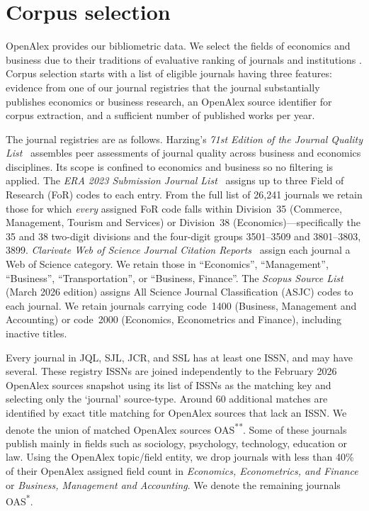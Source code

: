 \section{Corpus selection}
\label{sec:sources}
OpenAlex \citep{priemOpenAlexFullyopenIndex2022, alperinAnalysisSuitabilityOpenAlex2024, vaneckneesjanOpeningCWTSLeiden2024} provides our bibliometric data. We select the fields of economics and business due to their traditions of evaluative ranking of journals and institutions \citep[e.g.][]{liebowitzAssessingRelativeImpacts1984, boricPossibilitiesRankingBusiness2024}. Corpus selection starts with a list of eligible journals having three features: evidence from one of our journal registries that the journal substantially 
publishes economics or business research, an OpenAlex source identifier for corpus extraction, and a sufficient number of published works per year.

The journal registries are as follows. Harzing's \textit{71st Edition of the Journal Quality List}~\textcite[][JQL]{harzingJournalQualityList2024} assembles
peer assessments of journal quality across business and economics
disciplines. Its scope is confined to economics and business so no
filtering is applied.
The \textit{ERA 2023 Submission Journal List}~\textcite[][SJL]{australianresearchcouncilERA2023Submission2022} assigns up to three
Field of Research (FoR) codes to each entry.
From the full list of 26{,}241 journals we retain those for which \emph{every} assigned FoR code falls within
Division~35 (Commerce, Management, Tourism and Services) or
Division~38 (Economics)---specifically the 35 and 38 two-digit divisions and the four-digit groups
3501--3509 and 3801--3803, 3899.
\textit{Clarivate Web of Science Journal Citation Reports}~\textcite[][JCR]{clarivateanalyticsJournalCitationReports2026} assign each
journal a Web of Science category. We retain those in
``Economics'', ``Management'', ``Business'', ``Transportation'',
or ``Business, Finance''.
The \textit{Scopus Source List}~\textcite[][SSL]{elsevierScopusSourceList2026} (March 2026 edition) assigns All Science Journal Classification (ASJC) codes to each journal. We retain journals carrying code~1400 (Business, Management and Accounting) or code~2000 (Economics, Econometrics and Finance), including inactive titles.

Every journal in JQL, SJL, JCR, and SSL has at least one ISSN, and may have several. These registry ISSNs are joined independently to the February 2026 OpenAlex sources snapshot using its list of ISSNs as the matching key and selecting only the `journal' source-type. Around 60 additional matches are identified by exact title matching for OpenAlex sources that lack an ISSN. We denote the union of matched OpenAlex sources OAS\textsuperscript{**}. Some of these journals publish mainly in fields such as sociology, psychology, technology, education or law. Using the OpenAlex topic/field entity, we drop journals with less than 40\% of their OpenAlex assigned field count in \textit{Economics, Econometrics, and Finance} or \textit{Business, Management and Accounting}. We denote the remaining journals OAS\textsuperscript{*}.

